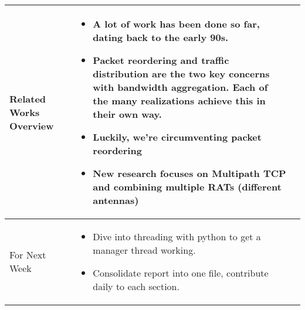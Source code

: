 \documentclass[a4wide,10pt]{extarticle}
\begin{document}
\begin{center}
\begin{tabular}{| m{3.0cm} | m{12.6cm} | m{2cm}|}
Related Works Overview &
	\begin{itemize}
		\item A lot of work has been done so far, dating back to the early 90s.
		\item Packet reordering and traffic distribution are the two key concerns with bandwidth aggregation. Each of the many realizations achieve this in their own way.
		\item Luckily, we're circumventing packet reordering
		\item New research focuses on Multipath TCP and combining multiple RATs (different antennas)
	\end{itemize}
\\ \hline
For Next Week &
	\begin{itemize}
		\item Dive into threading with python to get a manager thread working.
		\item Consolidate report into one file, contribute daily to each section.
	\end{itemize}
\\ \hline

\end{tabular}
\end{center}
\end{document}
